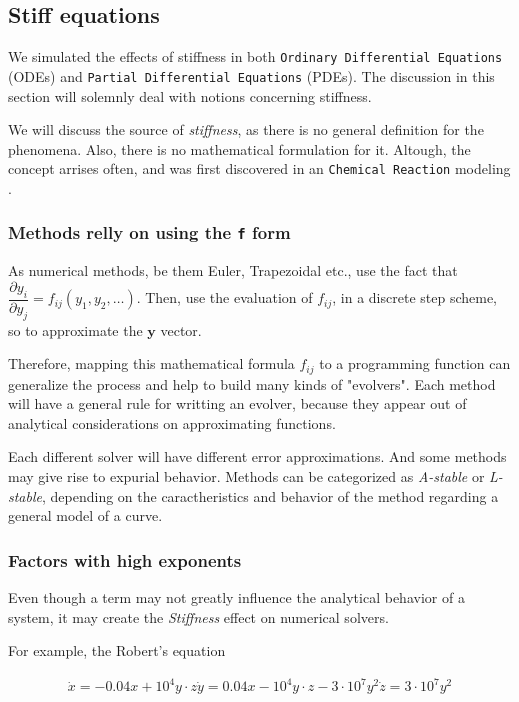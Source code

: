 \documentclass[11pt]{article}
\begin{document}
\subsection{Stiff equations}
\label{sec:org76b94b9}
We simulated the effects of stiffness in both \texttt{Ordinary Differential Equations}
(ODEs) and \texttt{Partial Differential Equations} (PDEs). The discussion in this
section will solemnly deal with notions concerning stiffness.

We will discuss the source of \emph{stiffness}, as there is no general definition for
the phenomena. Also, there is no mathematical formulation for it. Altough, the
concept arrises often, and was first discovered in an \texttt{Chemical Reaction}
modeling \cite{robertson1966solution}.

\subsubsection{Methods relly on using the \texttt{f} form}
\label{sec:org316c491}
As numerical methods, be them Euler, Trapezoidal etc., use the fact
that \(\dfrac{\partial{y_i}}{\partial{y_j}}=f_{ij}(y_1, y_2,
\ldots)\). Then, use the evaluation of \(f_{ij}\), in a discrete step
scheme, so to approximate the \(\mathbf{y}\) vector.

Therefore, mapping this mathematical formula \(f_{ij}\) to a programming
function can generalize the process and help to build many kinds of
"evolvers". Each method will have a general rule for writting an evolver,
because they appear out of analytical considerations on approximating functions.

Each different solver will have different error approximations. And some methods
may give rise to expurial behavior. Methods can be categorized as \emph{A-stable} or
\emph{L-stable}, depending on the caractheristics and behavior of the method regarding
a general model of a curve.

\subsubsection{Factors with high exponents}
\label{sec:org06878d1}
Even though a term may not greatly influence the analytical behavior of a
system, it may create the \emph{Stiffness} effect on numerical solvers.

For example, the Robert's equation

\begin{equation}
\begin{aligned}
{\dot {x}}=-0.04x+10^{4}y\cdot z
{\dot {y}}=0.04x-10^{4}y\cdot z-3\cdot 10^{7}y^{2}
{\dot {z}}=3\cdot 10^{7}y^{2}
\end{aligned}
\end{equation}
\end{document}
